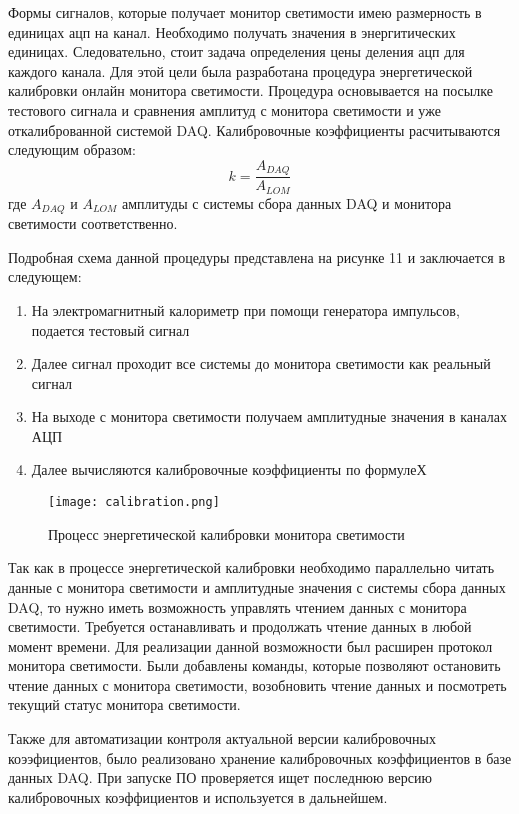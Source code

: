   Формы сигналов, которые получает монитор светимости имею размерность в единицах ацп на канал. Необходимо получать значения в энергитических единицах. Следовательно, стоит задача определения цены деления ацп для каждого канала. Для этой цели была разработана процедура энергетической калибровки онлайн монитора светимости. Процедура основывается на посылке тестового сигнала и сравнения амплитуд с монитора светимости и уже откалиброванной системой DAQ. Калибровочные коэффициенты расчитываются следующим образом:
\begin{equation}
  k = \frac{A_{DAQ}}{A_{LOM}}
\end{equation}
 где $A_{DAQ}$ и $A_{LOM}$ амплитуды с системы сбора данных DAQ и монитора светимости соответственно.\par
  Подробная схема данной процедуры представлена на рисунке 11 и заключается в следующем:
\begin{enumerate}
  \item На электромагнитный калориметр при помощи генератора импульсов, подается тестовый сигнал
  \item Далее сигнал проходит все системы до монитора светимости как реальный сигнал
  \item На выходе с монитора светимости получаем амплитудные значения в каналах АЦП
  \item Далее вычисляются калибровочные коэффициенты по формулеХ
\end{enumerate}\par
\begin{figure}[htp]
  \centering
  \texttt{[image: calibration.png]}
  \caption{Процесс энергетической калибровки монитора светимости}
  \label{fig:galaxy}
\end{figure}
  Так как в процессе энергетической калибровки необходимо параллельно читать данные с монитора светимости и амплитудные значения с системы сбора данных DAQ, то нужно иметь возможность управлять чтением данных с монитора светимости. Требуется останавливать и продолжать чтение данных в любой момент времени. Для реализации данной возможности был расширен протокол монитора светимости. Были добавлены команды, которые позволяют остановить чтение данных с монитора светимости, возобновить чтение данных и посмотреть текущий статус монитора светимости.\par
  Также для автоматизации контроля актуальной версии калибровочных коээфициентов, было реализовано хранение калибровочных коэффициентов в базе данных DAQ. При запуске ПО  проверяется ищет последнюю версию калибровочных коэффициентов и используется в дальнейшем.\par

